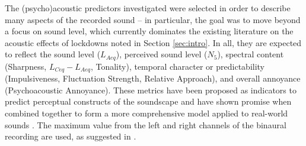 The (psycho)acoustic predictors investigated were selected in order to describe many aspects of the recorded sound – in particular, the goal was to move beyond a focus on sound level, which currently dominates the existing literature on the acoustic effects of lockdowns noted in Section \ref{sec:intro}. In all, they are expected to reflect the sound level ($L_{Aeq}$), perceived sound level ($N_5$), spectral content (Sharpness, $L_{Ceq}-L_{Aeq}$, Tonality), temporal character or predictability (Impulsiveness, Fluctuation Strength, Relative Approach), and overall annoyance (Psychoacoustic Annoyance). These metrics have been proposed as indicators to predict perceptual constructs of the soundscape \citep{Aletta2016Soundscape, Aletta2017Dimensions} and have shown promise when combined together to form a more comprehensive model applied to real-world sounds \citep{Orga2021Multilevel}. The maximum value from the left and right channels of the binaural recording are used, as suggested in \citet{international_organisation_for_standardization_isots_2019}. 

